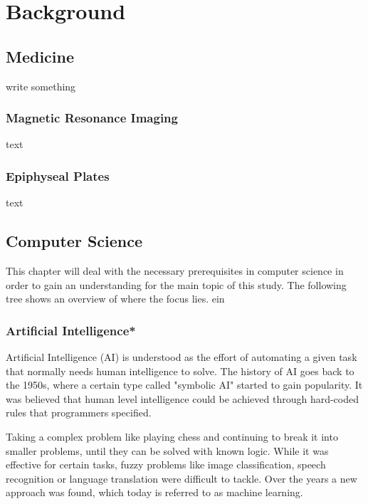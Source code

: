 \section{Background}

\subsection{Medicine}

write something

\subsubsection{Magnetic Resonance Imaging}

text

\subsubsection{Epiphyseal Plates}

text

\subsection{Computer Science}

This chapter will deal with the necessary prerequisites in computer science in order to gain an understanding for the main topic of this study. The following tree shows an overview of where the focus lies. ein

\subsubsection{Artificial Intelligence*}

Artificial Intelligence (AI) is understood as the effort of automating a given task that normally needs human intelligence to solve\cite{Chollet2017}. The history of AI goes back to the 1950s, where a certain type called "symbolic AI" started to gain popularity. It was believed that human level intelligence could be achieved through hard-coded rules that programmers specified. 

Taking a complex problem like playing chess and continuing to break it into smaller problems, until they can be solved with known logic. While it was effective for certain tasks, fuzzy problems like image classification, speech recognition or language translation were difficult to tackle. Over the years a new approach was found, which today is referred to as machine learning.

